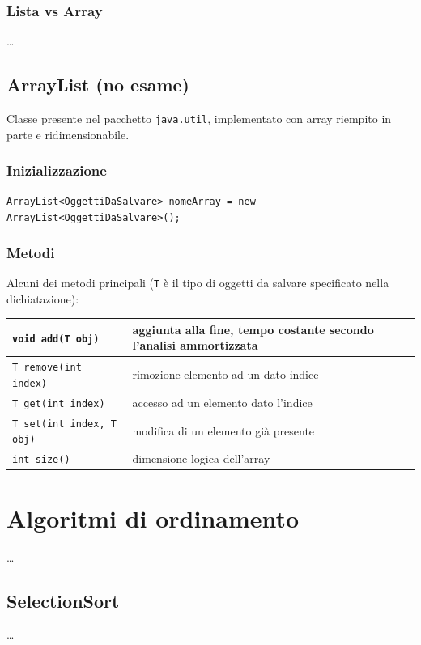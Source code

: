 \documentclass[a4paper]{article}
\begin{document}
\subsubsection*{Lista vs Array}
\dots

\subsection{ArrayList (no esame)}
Classe presente nel pacchetto \verb|java.util|, implementato con array riempito in parte e ridimensionabile.

\subsubsection*{Inizializzazione}
\verb|ArrayList<OggettiDaSalvare> nomeArray = new ArrayList<OggettiDaSalvare>();|

\subsubsection*{Metodi}
Alcuni dei metodi principali (\verb|T| è il tipo di oggetti da salvare specificato nella dichiatazione):

\begin{center}
	\begin{tabularx}{\textwidth}{l X}
		\toprule
		\verb|void add(T obj)| & aggiunta alla fine, tempo costante secondo l'analisi ammortizzata \\
		\midrule
		\verb|T remove(int index)| & rimozione elemento ad un dato indice \\
		\midrule
		\verb|T get(int index)| & accesso ad un elemento dato l'indice \\
		\midrule
		\verb|T set(int index, T obj)| & modifica di un elemento già presente \\
		\midrule
		\verb|int size()| & dimensione logica dell'array \\
		\bottomrule
	\end{tabularx}
\end{center}

\newpage


\section{Algoritmi di ordinamento}
\dots

\subsection{SelectionSort}
\dots
\end{document}
